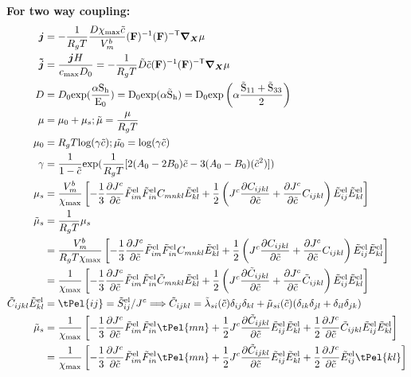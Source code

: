\documentclass[../main.tex]{subfiles}
\begin{document}
\textbf{For two way coupling:}
\begin{align}
    \bm{j} &= - \fc{1}{R_g T} \fc{D\xmax \tc}{V^b_m} \inv{\F} \invT{\F} \nablaX \mu \\
    \bm{\td{j}} &= \frac{\bm{j} H}{\cmax D_0} =-\fc{1}{R_g T} \td{D} \tc \inv{\F} \invT{\F} \nablaX \mu \\
    D &= D_0 \rm{exp}(\fc{\alpha S_h}{E_0}) = D_0 \rm{exp}(\alpha \td{S}_h)= D_0 \rm{exp}\left(\alpha \frac{\td{S}_{11}+\td{S}_{33}}{2}\right) \\ 
    \mu &= \mu_0 + \mu_s; \td{\mu} = \frac{\mu}{R_g T} \\
    \mu_0 &= R_g T \text{log}(\gamma \td{c}); \td{\mu_0} = \text{log}(\gamma \td{c})\\
    \gamma &= \fc{1}{1-\td{c}}\text{exp}(\fc{1}{R_g T}[2(A_0 - 2B_0)\td{c} - 3(A_0 - B_0)(\td{c}^2)])\\
    \mu_s &= \fc{V_m^b}{\xmax}\left[-\fc{1}{3}\pdiff{\jc}{\tc}\tFel{im}\tFel{in}{C}_{mnkl}\tEel{kl} + \fc{1}{2}\left(\jc \pdiff{C_{ijkl}}{\tc} + \pdiff{\jc}{\tc} C_{ijkl}\right)\tEel{ij}\tEel{kl}\right] \\
    \td{\mu}_s &= \frac{1}{R_g T} \mu_s \\
        &= \fc{V_m^b}{R_g T \xmax}\left[-\fc{1}{3}\pdiff{\jc}{\tc}\tFel{im}\tFel{in}{C}_{mnkl}\tEel{kl} + \fc{1}{2}\left(\jc \pdiff{C_{ijkl}}{\tc} + \pdiff{\jc}{\tc} C_{ijkl}\right)\tEel{ij}\tEel{kl}\right] \\ 
        &= \fc{1}{\xmax}\left[-\fc{1}{3}\pdiff{\jc}{\tc}\tFel{im}\tFel{in}{\td{C}}_{mnkl}\tEel{kl} + \fc{1}{2}\left(\jc \pdiff{\td{C}_{ijkl}}{\tc} + \pdiff{\jc}{\tc} \td{C}_{ijkl}\right)\tEel{ij}\tEel{kl}\right] \\
    \td{C}_{ijkl} \tEel{kl} &= \tPel{ij}  = \tSel{ij}/\jc \Longrightarrow \td{C}_{ijkl} = \td{\lambda}_{si}(\tc)\delta_{ij} \delta_{kl} +  \td{\mu}_{si}(\tc)(\delta_{ik} \delta_{jl} + \delta_{il} \delta_{jk})  \\
    \td{\mu}_s &= \fc{1}{\xmax}\left[-\fc{1}{3}\pdiff{\jc}{\tc}\tFel{im}\tFel{in}\tPel{mn} + \fc{1}{2}\jc \pdiff{\td{C}_{ijkl}}{\tc}\tEel{ij}\tEel{kl} + \fc{1}{2} \pdiff{\jc}{\tc} \td{C}_{ijkl}\tEel{ij}\tEel{kl}\right] \\
    &= \fc{1}{\xmax}\left[-\fc{1}{3}\pdiff{\jc}{\tc}\tFel{im}\tFel{in}\tPel{mn} + \fc{1}{2}\jc \pdiff{\td{C}_{ijkl}}{\tc}\tEel{ij}\tEel{kl} + \fc{1}{2} \pdiff{\jc}{\tc} \tEel{ij}\tPel{kl}\right] \\

\end{align}
\end{document}
